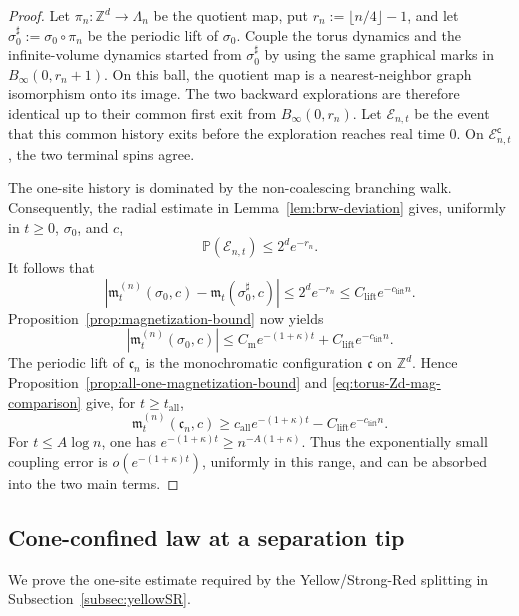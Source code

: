 \documentclass[letterpaper,11pt,reqno]{amsart}
\theoremstyle{definition}
\begin{document}
\begin{proof}
Let
\(\pi_n:\mathbb Z^d\to\Lambda_n\) be the quotient map, put
\(r_n:=\lfloor n/4\rfloor-1\), and let
\(\sigma_0^\sharp:=\sigma_0\circ\pi_n\) be the periodic lift of \(\sigma_0\).
Couple the torus dynamics and the infinite-volume dynamics started from
\(\sigma_0^\sharp\) by using the same graphical marks in
\(B_\infty(0,r_n+1)\). On this ball, the quotient map is a nearest-neighbor
graph isomorphism onto its image. The two backward explorations are therefore
identical up to their common first exit from \(B_\infty(0,r_n)\). Let
\(\mathcal E_{n,t}\) be the event that this common history exits before the
exploration reaches real time \(0\). On
\(\mathcal E_{n,t}^{\mathsf c}\), the two terminal spins agree.

The one-site history is dominated by the non-coalescing branching walk.
Consequently, the radial estimate in Lemma~\ref{lem:brw-deviation} gives,
uniformly in \(t\ge0\), \(\sigma_0\), and \(c\),
\[
\mathbb P(\mathcal E_{n,t})
\le
2^d e^{- r_n}.
\]
It follows that
\begin{equation}\label{eq:torus-Zd-mag-comparison}
\left|
\mathfrak m_t^{(n)}(\sigma_0,c)
-
\mathfrak m_t(\sigma_0^\sharp,c)
\right|
\le
2^d e^{- r_n}
\le
C_{\mathrm{lift}}e^{-c_{\mathrm{lift}}n}.
\end{equation}
Proposition~\ref{prop:magnetization-bound} now yields
\[
\left|\mathfrak m_t^{(n)}(\sigma_0,c)\right|
\le
C_{\mathrm m}e^{-(1+\kappa)t}
+
C_{\mathrm{lift}}e^{-c_{\mathrm{lift}}n}.
\]
The periodic lift of \(\mathfrak c_n\) is the monochromatic configuration
\(\mathfrak c\) on \(\mathbb Z^d\). Hence
Proposition~\ref{prop:all-one-magnetization-bound} and
\eqref{eq:torus-Zd-mag-comparison} give, for \(t\ge t_{\mathrm{all}}\),
\[
\mathfrak m_t^{(n)}(\mathfrak c_n,c)
\ge
c_{\mathrm{all}}e^{-(1+\kappa)t}
-
C_{\mathrm{lift}}e^{-c_{\mathrm{lift}}n}.
\]
For \(t\le A\log n\), one has
\(e^{-(1+\kappa)t}\ge n^{-A(1+\kappa)}\). Thus the exponentially small
coupling error is \(o(e^{-(1+\kappa)t})\), uniformly in this range, and can be
absorbed into the two main terms.
\end{proof}
\subsection{Cone-confined law at a separation tip}
\label{subsec:cone-confined}

We prove the one-site estimate required by the Yellow/Strong-Red splitting in
Subsection~\ref{subsec:yellowSR}. 
\end{document}
